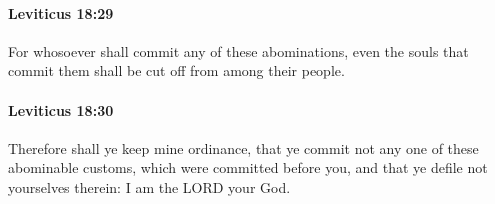 		\paragraph{Leviticus 18:29} %
			\label{LEVITICUS-18-29}

			For whosoever shall commit any of these abominations, even the souls that commit them shall be cut off from among their people.


		\paragraph{Leviticus 18:30} %
			\label{LEVITICUS-18-30}

			Therefore shall ye keep mine ordinance, that ye commit not any one of these abominable customs, which were committed before you, and that ye defile not yourselves therein: I am the LORD your God.

